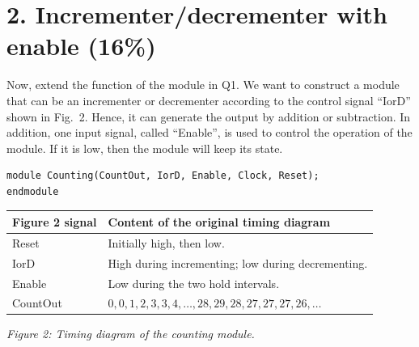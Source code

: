 \documentclass[11pt,a4paper]{article}
\begin{document}
\section*{2. Incrementer/decrementer with enable (16\%)}
Now, extend the function of the module in Q1. We want to construct a module that can be an incrementer or decrementer according to the control signal ``IorD'' shown in Fig.~2. Hence, it can generate the output by addition or subtraction. In addition, one input signal, called ``Enable'', is used to control the operation of the module. If it is low, then the module will keep its state.
\par\medskip\noindent\begin{minipage}{\linewidth}
\begin{lstlisting}
module Counting(CountOut, IorD, Enable, Clock, Reset);
endmodule
\end{lstlisting}
\end{minipage}\par
\begin{center}
\begin{tabular}{lp{105mm}}
\toprule
Figure 2 signal & Content of the original timing diagram\\
\midrule
Reset & Initially high, then low.\\
IorD & High during incrementing; low during decrementing.\\
Enable & Low during the two hold intervals.\\
CountOut & $0,0,1,2,3,3,4,\ldots,28,29,28,27,27,27,26,\ldots$\\
\bottomrule
\end{tabular}
\end{center}
\textit{Figure 2: Timing diagram of the counting module.}
\end{document}
